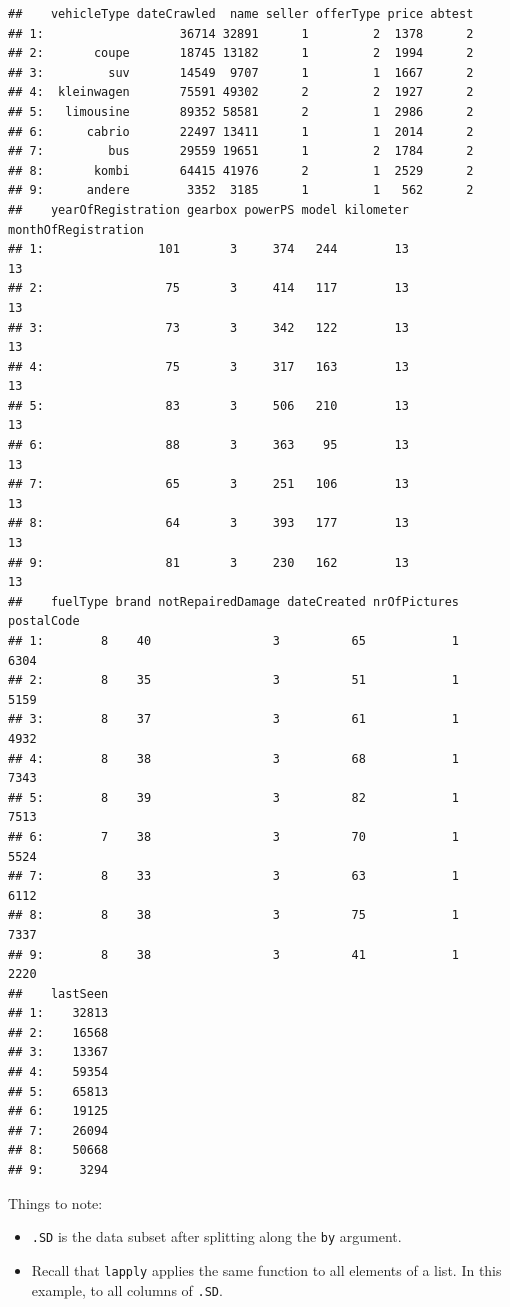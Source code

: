 \documentclass[]{book}
\providecommand{\tightlist}{%
  \setlength{\itemsep}{0pt}\setlength{\parskip}{0pt}}
\theoremstyle{definition}
\theoremstyle{definition}
\theoremstyle{definition}
\theoremstyle{remark}
\begin{document}
\begin{verbatim}
##    vehicleType dateCrawled  name seller offerType price abtest
## 1:                   36714 32891      1         2  1378      2
## 2:       coupe       18745 13182      1         2  1994      2
## 3:         suv       14549  9707      1         1  1667      2
## 4:  kleinwagen       75591 49302      2         2  1927      2
## 5:   limousine       89352 58581      2         1  2986      2
## 6:      cabrio       22497 13411      1         1  2014      2
## 7:         bus       29559 19651      1         2  1784      2
## 8:       kombi       64415 41976      2         1  2529      2
## 9:      andere        3352  3185      1         1   562      2
##    yearOfRegistration gearbox powerPS model kilometer monthOfRegistration
## 1:                101       3     374   244        13                  13
## 2:                 75       3     414   117        13                  13
## 3:                 73       3     342   122        13                  13
## 4:                 75       3     317   163        13                  13
## 5:                 83       3     506   210        13                  13
## 6:                 88       3     363    95        13                  13
## 7:                 65       3     251   106        13                  13
## 8:                 64       3     393   177        13                  13
## 9:                 81       3     230   162        13                  13
##    fuelType brand notRepairedDamage dateCreated nrOfPictures postalCode
## 1:        8    40                 3          65            1       6304
## 2:        8    35                 3          51            1       5159
## 3:        8    37                 3          61            1       4932
## 4:        8    38                 3          68            1       7343
## 5:        8    39                 3          82            1       7513
## 6:        7    38                 3          70            1       5524
## 7:        8    33                 3          63            1       6112
## 8:        8    38                 3          75            1       7337
## 9:        8    38                 3          41            1       2220
##    lastSeen
## 1:    32813
## 2:    16568
## 3:    13367
## 4:    59354
## 5:    65813
## 6:    19125
## 7:    26094
## 8:    50668
## 9:     3294
\end{verbatim}

Things to note:

\begin{itemize}
\tightlist
\item
  \texttt{.SD} is the data subset after splitting along the \texttt{by} argument.
\item
  Recall that \texttt{lapply} applies the same function to all elements of a list. In this example, to all columns of \texttt{.SD}.
\end{itemize}
\end{document}
